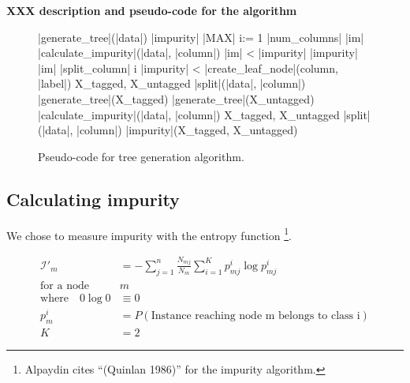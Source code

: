 \documentclass[a4paper,10pt]{article}
\newcommand{\XXX}[1]{{\bf XXX #1}}
\begin{document}
\XXX{description and pseudo-code for the algorithm}

\begin{figure}[th]
  \centering
  \begin{minipage}[c]{1.0\textwidth}
\begin{program}
  \PROC |generate_tree|(|data|) \BODY
  |impurity| \leftarrow |MAX|
  \FOR i:= 1 \TO |num_columns| \DO
       |im| \leftarrow |calculate_impurity|(|data|, |column|)
       \IF |im| < |impurity| 
       \THEN
          |impurity| \leftarrow |im|
          |split_column| \leftarrow i
       \FI
       \OD
  \IF |impurity| < \theta 
  \THEN
       |create_leaf_node|(column, |label|)
       \EXIT 
       \FI
  X_{tagged}, X_{untagged} \leftarrow |split|(|data|, |column|)
  |generate_tree|(X_{tagged})
  |generate_tree|(X_{untagged})
  \ENDPROC
  \PROC |calculate_impurity|(|data|, |column|) \BODY
  X_{tagged}, X_{untagged} \leftarrow |split|(|data|, |column|)
  |impurity|(X_{tagged}, X_{untagged})
  \ENDPROC
\end{program}
  \end{minipage}
  \caption{Pseudo-code for tree generation algorithm.}
  \label{fig:tree-gen}
\end{figure}


\subsection{Calculating impurity}

We chose to measure impurity with the entropy function
\cite[p. 176]{alpaydin2004}\footnote{Alpaydin cites ``(Quinlan 1986)''
  for the impurity algorithm.}.

\begin{equation}
\begin{split}
\mathcal{I}'_m &= - \sum_{j=1}^n\frac{N_{mj}}{N_m}\sum_{i=1}^K p_{mj}^i 
    \log p_{mj}^i  \label{eqn:impurity} \\
\text{for a node} \quad & m  \\
\text{where} \quad 0 \log 0 &\equiv 0  \\
p_m^i &= P(\text{Instance reaching node m belongs to class i})  \\
K &= 2
\end{split}
\end{equation}
\end{document}
